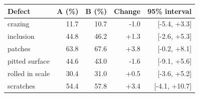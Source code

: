 \begin{tabular}{lrrrr}
\hline
Defect & A (\%) & B (\%) & Change & 95\% interval \\
\hline
crazing & 11.7 & 10.7 & -1.0 & [-5.4, +3.3] \\
inclusion & 44.8 & 46.2 & +1.3 & [-2.6, +5.3] \\
patches & 63.8 & 67.6 & +3.8 & [-0.2, +8.1] \\
pitted surface & 44.6 & 43.0 & -1.6 & [-9.1, +5.6] \\
rolled in scale & 30.4 & 31.0 & +0.5 & [-3.6, +5.2] \\
scratches & 54.4 & 57.8 & +3.4 & [-4.1, +10.7] \\
\hline
\end{tabular}
